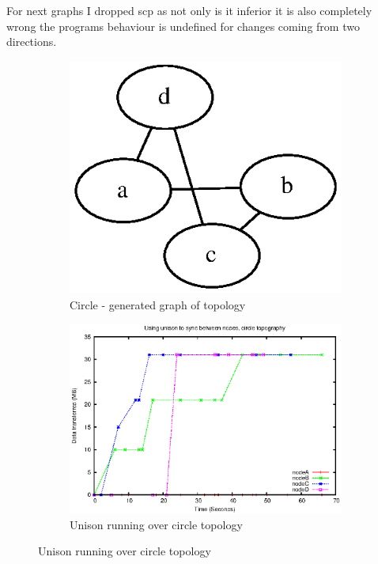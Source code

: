 \documentclass[12pt]{article}
\begin{document}
For next graphs I dropped scp as not only is it inferior it is also
completely wrong the programs behaviour is undefined for changes
coming from two directions.
\begin{figure}[htp]
    \begin{subfigure}[b]{0.5\linewidth}
        \centering
        \includegraphics[scale=0.5]{images/circ-graph.eps}
        \caption{Circle - generated graph of topology}
        \label{fig:full_circ_graph}
    \end{subfigure}
    \begin{subfigure}[b]{0.5\linewidth}
        \centering
        \includegraphics[scale=0.5]{images/circ-uni-10-aite.eps}
        \caption{Unison running over circle topology}
        \label{fig:full_circ_uni}
    \end{subfigure}


\end{figure}
\end{document}
